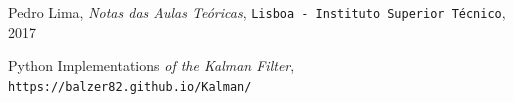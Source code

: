 \documentclass[a4paper]{IEEEtran}
\begin{document}
\begin{thebibliography}{9}

  Pedro Lima,
  \emph{Notas das Aulas Teóricas},
  \texttt{Lisboa - Instituto Superior Técnico},
  2017

  Python Implementations
  \emph{of the Kalman Filter},
  \texttt{https://balzer82.github.io/Kalman/}
  
\end{thebibliography}
\end{document}

